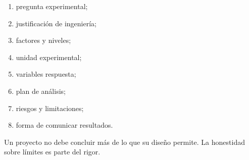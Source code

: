 \begin{enumerate}
  \item pregunta experimental;
  \item justificación de ingeniería;
  \item factores y niveles;
  \item unidad experimental;
  \item variables respuesta;
  \item plan de análisis;
  \item riesgos y limitaciones;
  \item forma de comunicar resultados.
\end{enumerate}

\begin{cuidado}
Un proyecto no debe concluir más de lo que su diseño permite. La honestidad sobre límites es parte del rigor.
\end{cuidado}
